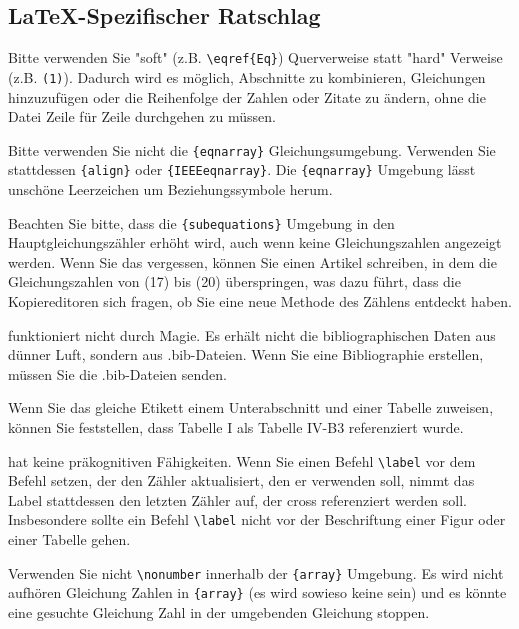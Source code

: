 \documentclass[conference]{IEEEtran}
\begin{document}
\subsection{\LaTeX-Spezifischer Ratschlag}

Bitte verwenden Sie "soft" (z.B. \verb|\eqref{Eq}|) Querverweise statt "hard" Verweise (z.B. \verb|(1)|). Dadurch wird es möglich, Abschnitte zu kombinieren, Gleichungen hinzuzufügen oder die Reihenfolge der Zahlen oder Zitate zu ändern, ohne die Datei Zeile für Zeile durchgehen zu müssen.

Bitte verwenden Sie nicht die \verb|{eqnarray}| Gleichungsumgebung. Verwenden Sie stattdessen \verb|{align}| oder \verb|{IEEEeqnarray}|. Die \verb|{eqnarray}| Umgebung lässt unschöne Leerzeichen um Beziehungssymbole herum.

Beachten Sie bitte, dass die \verb|{subequations}| Umgebung in den Hauptgleichungszähler erhöht wird, auch wenn keine Gleichungszahlen angezeigt werden. Wenn Sie das vergessen, können Sie einen Artikel schreiben, in dem die Gleichungszahlen von (17) bis (20) überspringen, was dazu führt, dass die Kopiereditoren sich fragen, ob Sie eine neue Methode des Zählens entdeckt haben.

funktioniert nicht durch Magie. Es erhält nicht die bibliographischen Daten aus dünner Luft, sondern aus .bib-Dateien. Wenn Sie eine Bibliographie erstellen, müssen Sie die .bib-Dateien senden.

Wenn Sie das gleiche Etikett einem Unterabschnitt und einer Tabelle zuweisen, können Sie feststellen, dass Tabelle I als Tabelle IV-B3 referenziert wurde.

hat keine präkognitiven Fähigkeiten. Wenn Sie einen Befehl \verb|\label| vor dem Befehl setzen, der den Zähler aktualisiert, den er verwenden soll, nimmt das Label stattdessen den letzten Zähler auf, der cross referenziert werden soll. Insbesondere sollte ein Befehl \verb|\label| nicht vor der Beschriftung einer Figur oder einer Tabelle gehen.

Verwenden Sie nicht \verb|\nonumber| innerhalb der \verb|{array}| Umgebung. Es wird nicht aufhören Gleichung Zahlen in \verb|{array}| (es wird sowieso keine sein) und es könnte eine gesuchte Gleichung Zahl in der umgebenden Gleichung stoppen.
\end{document}
